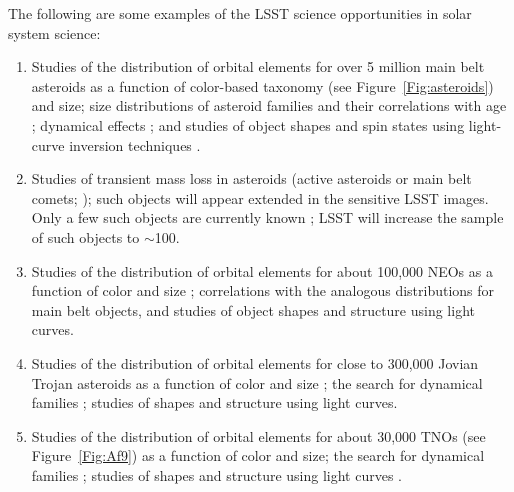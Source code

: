 The following are some examples of the LSST science opportunities in
solar system science:
\begin{enumerate}

\item Studies of the distribution of orbital elements for over 5 million main belt
asteroids as a function of color-based taxonomy (see Figure~\ref{Fig:asteroids})
and size; size distributions of asteroid families \citep{2008Icar..198..138P} and their
correlations with age \citep{2004Natur.429..275J,2005Icar..173..132N}; dynamical
effects \citep{2001Sci...294.1693B}; and studies of object shapes and spin states using
light-curve inversion techniques \citep{2000Icar..148...12P,2009A&A...493..291D}.

\item Studies of transient mass loss in asteroids (active asteroids or main belt comets;
\citealt{2006Sci...312..561H}); such objects will appear extended in the
sensitive LSST images. Only a few such objects are currently known
\citep{2011AJ....142...28J,2012AJ....143...66J};
LSST
will increase the sample of such objects to $\sim$100.

\item Studies of the distribution of orbital elements for about 100,000 NEOs as a
function of color and size \citep{1993ApJ...407..412R,2003Icar..163..363D};
correlations with the analogous distributions for
main belt objects, and studies of object shapes and structure using light curves.

\item Studies of the distribution of orbital elements for close to 300,000 Jovian Trojan
asteroids as a function of color and size \citep{2000AJ....120.1140J,2005AJ....130.2900Y,2007MNRAS.377.1393S};
the search for dynamical families
\citep{2005HiA....13..758K}; studies of shapes and structure using light curves.

\item Studies of the distribution of orbital elements for about 30,000 TNOs (see
Figure~\ref{Fig:Af9}) as a function of color and size; the search for dynamical families
\citep{2011ApJ...733...40M}; studies of shapes and structure using light curves
\citep{1995AJ....110.3073D,2001AJ....122..457T,2001AJ....122.1051G,2004AJ....128.1364B,2005AJ....129.1117E,2006Icar..185..508J,2007AJ....134.2186D}.


\end{enumerate}
